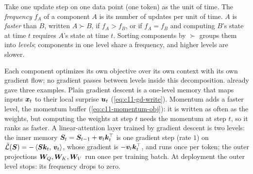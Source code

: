 \begin{definition}\label{def:c11-frequency}
Take one update step on one data point (one token) as the unit of time. The \emph{frequency}
$f_A$ of a component $A$ is its number of updates per unit of time. $A$ is \emph{faster} than
$B$, written $A \succ B$, if $f_A > f_B$, or if $f_A = f_B$ and computing $B$'s state at time
$t$ requires $A$'s state at time $t$. Sorting components by $\succ$ groups them into
\emph{levels}; components in one level share a frequency, and higher levels are slower.
\end{definition}

Each component optimizes its own objective over its own context with its own gradient flow; no
gradient passes between levels inside this decomposition.  already gave
three examples. Plain gradient descent is a one-level memory that maps inputs $\bm{x}_t$ to their
local surprise $\bm{u}_t$ (\cref{eq:c11-gd-write}). Momentum adds a faster level, the momentum
buffer (\cref{eq:c11-momentum-obj}): it is written as often as the weights, but computing the
weights at step $t$ needs the momentum at step $t$, so it ranks as faster. A linear-attention layer trained by gradient descent is
two levels: the inner memory $\bm{S}_t = \bm{S}_{t-1} + \bm{v}_t\bm{k}_t^{\top}$ is one gradient step (rate $1$) on
$\tilde{\mathcal{L}}(\bm{S}) = -\left\langle \bm{S}\bm{k}_t,\, \bm{v}_t\right\rangle$, whose gradient is $-\bm{v}_t\bm{k}_t^{\top}$, and runs once per
token; the outer projections $\bm{W}_Q, \bm{W}_K, \bm{W}_V$ run once per training batch. At deployment the
outer level stops: its frequency drops to zero.

